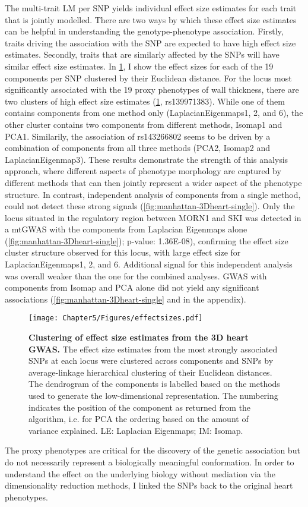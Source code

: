 %
The multi-trait LM per SNP yields individual effect size estimates for each trait that is jointly modelled. There are two ways by which these effect size estimates can be helpful in understanding the genotype-phenotype association. Firstly, traits driving the association with the SNP are expected to have high effect size estimates. Secondly, traits that are similarly affected by the SNPs will have similar effect size estimates.  In \cref{fig:effectsizes-heart}, I show the effect sizes for each of the \num{19} components per SNP clustered by their Euclidean distance. For the locus most significantly associated with the \num{19} proxy phenotypes of wall thickness, there are two clusters of high effect size estimates (\cref{fig:effectsizes-heart}, rs139971383). While one of them contains components from one method only (LaplacianEigenmaps1, 2, and 6), the other cluster contains two components from different methods, Isomap1 and PCA1. Similarily, the association of rs143266802 seems to be driven by a combination of components from all three methods (PCA2, Isomap2 and LaplacianEigenmap3). These results demonstrate the strength of this analysis approach, where different aspects of phenotype morphology are captured by different methods that can then jointly represent a wider aspect of the phenotype structure. In contrast, independent analysis of components from a single method, could not detect these strong signals (\cref{fig:manhattan-3Dheart-single}). Only the locus situated in the regulatory region between MORN1 and SKI was detected in a mtGWAS with the components from Laplacian Eigenmaps alone (\cref{fig:manhattan-3Dheart-single}); p-value: \num{1.36E-08}), confirming the effect size cluster structure observed for this locus, with large effect size for LaplacianEigenmaps1, 2, and 6. Additional signal for this independent analysis was overall weaker than the one for the combined analyses. GWAS with components from Isomap and PCA alone did not yield any significant associations (\cref{fig:manhattan-3Dheart-single} and  in the appendix). 
%
\begin{figure}[hbtp]
	\centering
	\texttt{[image: Chapter5/Figures/effectsizes.pdf]}
	\caption[\textbf{Clustering of effect size estimates from the 3D heart GWAS. }]{\textbf{Clustering of effect size estimates from the 3D heart GWAS. } The effect size estimates from the most strongly associated SNPs at each locus were clustered across components and SNPs by average-linkage hierarchical clustering of their Euclidean distances. The dendrogram of the components is labelled based on the methods used to generate the low-dimensional representation. The numbering indicates the position of the component as returned from the algorithm, i.e. for PCA the ordering based on the amount of variance explained. LE: Laplacian Eigenmaps; IM: Isomap.} 
	 	\label{fig:effectsizes-heart}
\end{figure}
%
The proxy phenotypes are critical for the discovery of the genetic association but do not necessarily represent a biologically meaningful conformation. In order to understand the effect on the underlying biology without mediation via the dimensionality reduction methods, I linked the SNPs back to the original heart phenotypes.

